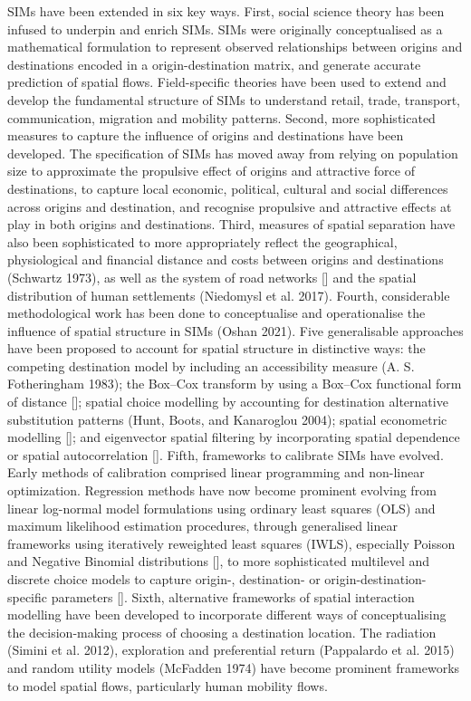 \documentclass[11pt,letterpaper]{article}
\begin{document}
SIMs have been extended in six key ways.
First, social science theory has been infused to underpin and enrich SIMs.
SIMs were originally conceptualised as a mathematical formulation to represent observed relationships between origins and destinations encoded in a origin-destination matrix, and generate accurate prediction of spatial flows.
Field-specific theories have been used to extend and develop the fundamental structure of SIMs to understand retail, trade, transport, communication, migration and mobility patterns.
Second, more sophisticated measures to capture the influence of origins and destinations have been developed.
The specification of SIMs has moved away from relying on population size to approximate the propulsive effect of origins and attractive force of destinations, to capture local economic, political, cultural and social differences across origins and destination, and recognise propulsive and attractive effects at play in both origins and destinations.
Third, measures of spatial separation have also been sophisticated to more appropriately reflect the geographical, physiological and financial distance and costs between origins and destinations (Schwartz 1973), as well as the system of road networks {[}{]} and the spatial distribution of human settlements (Niedomysl et al. 2017).
Fourth, considerable methodological work has been done to conceptualise and operationalise the influence of spatial structure in SIMs (Oshan 2021).
Five generalisable approaches have been proposed to account for spatial structure in distinctive ways: the competing destination model by including an accessibility measure (A. S. Fotheringham 1983); the Box--Cox transform by using a Box--Cox functional form of distance {[}{]}; spatial choice modelling by accounting for destination alternative substitution patterns (Hunt, Boots, and Kanaroglou 2004); spatial econometric modelling {[}{]}; and eigenvector spatial filtering by incorporating spatial dependence or spatial autocorrelation {[}{]}.
Fifth, frameworks to calibrate SIMs have evolved.
Early methods of calibration comprised linear programming and non-linear optimization.
Regression methods have now become prominent evolving from linear log-normal model formulations using ordinary least squares (OLS) and maximum likelihood estimation procedures, through generalised linear frameworks using iteratively reweighted least squares (IWLS), especially Poisson and Negative Binomial distributions {[}{]}, to more sophisticated multilevel and discrete choice models to capture origin-, destination- or origin-destination-specific parameters {[}{]}.
Sixth, alternative frameworks of spatial interaction modelling have been developed to incorporate different ways of conceptualising the decision-making process of choosing a destination location.
The radiation (Simini et al. 2012), exploration and preferential return (Pappalardo et al. 2015) and random utility models (McFadden 1974) have become prominent frameworks to model spatial flows, particularly human mobility flows.
\end{document}
